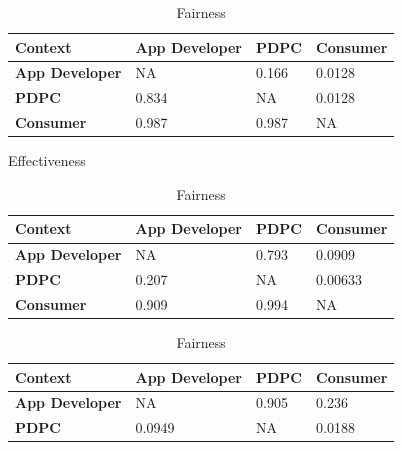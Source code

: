 \begin{table}[!ht]
  \begin{subtable}[h]{1\textwidth}
    \centering  
    \begin{tabular}{|l|l|l|l|}
      \hline
      \textbf{Context}       & \textbf{App Developer} & \textbf{PDPC} & \textbf{Consumer} \\
      \hline
      \textbf{App Developer} & NA                     & 0.166         & \cellcolor{red!25}0.0128            \\
      \hline
      \textbf{PDPC}          & 0.834                  & NA            & \cellcolor{red!25}0.0128            \\
      \hline
      \textbf{Consumer}      & 0.987                  & 0.987         & NA                \\      
      \hline
    \end{tabular}
    \caption{Effectiveness}
    \label{tab:effectiveness_before}
  \end{subtable}
  \vfill
  \begin{subtable}[h]{1\textwidth}
    \centering  
    \begin{tabular}{|l|l|l|l|}
      \hline
      \textbf{Context}       & \textbf{App Developer} & \textbf{PDPC} & \textbf{Consumer} \\ \hline
      \textbf{App Developer} & NA                     & 0.793         & \cellcolor{red!25}0.0909            \\ \hline
      \textbf{PDPC}          & 0.207                  & NA            & \cellcolor{red!25}0.00633           \\ \hline
      \textbf{Consumer}      & 0.909                  & 0.994         & NA                \\ \hline
    \end{tabular}
      \caption{Fairness}
      \label{tab:fairness_before}
  \end{subtable}
  \vfill
  \begin{subtable}[h]{1\textwidth}
    \centering
    \begin{tabular}{|l|l|l|l|}
      \hline
      \textbf{Context}       & \textbf{App Developer} & \textbf{PDPC} & \textbf{Consumer} \\
      \hline
      \textbf{App Developer} & NA                     & 0.905         & 0.236             \\
      \hline
      \textbf{PDPC}          & \cellcolor{red!25}0.0949                 & NA            & \cellcolor{red!25}0.0188            \\

\end{tabular}
\end{subtable}
\end{table}
